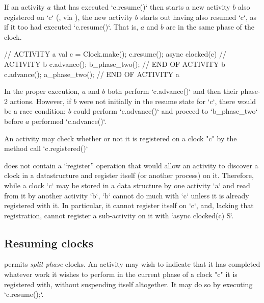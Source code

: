 
If an activity {$a$} that has executed \xcd`c.resume()` then starts a
new activity {$b$} also registered on \xcd`c` (\eg, via ), the new activity {$b$} starts out having also resumed
\xcd`c`, as if it too had executed \xcd`c.resume()`. That is, $a$ and {$b$}
are in the same phase of the clock. 
\begin{xten}
// ACTIVITY a
val c = Clock.make();
c.resume();
async clocked(c) {
  // ACTIVITY b
  c.advance();
  b_phase_two();
  // END OF ACTIVITY b
}
c.advance();
a_phase_two();
// END OF ACTIVITY a
\end{xten}
In the proper execution, {$a$} and {$b$} both perform
\xcd`c.advance()` and then their phase-2 actions.  
However, if {$b$} were not
initially in the resume state for \xcd`c`, there would be a race condition;
{$b$} could perform \xcd`c.advance()` and proceed to \xcd`b_phase_two`
before {$a$} performed \xcd`c.advance()`.


An activity may check whether or not it is registered on a clock \xcd"c" by
the method call \xcd`c.registered()`


\begin{note}
\Xten{} does not contain a ``register'' operation that would allow an activity
to discover a clock in a datastructure and register itself (or another
process) on it. Therefore,
while a clock \xcd`c` may be stored in a data structure by one activity
\xcd`a` and read from it by another activity \xcd`b`, \xcd`b` cannot do much
with \xcd`c` unless it is already registered with it.  In particular, it
cannot register itself on \xcd`c`, and, lacking that registration, cannot
register a sub-activity on it with \xcd`async clocked(c) S`.
\end{note}


\subsection{Resuming clocks}\label{resume}\label{sec:clock:resume}
\Xten{} permits {\em split phase} clocks. An activity may wish
to indicate that it has completed whatever work it wishes to perform
in the current phase of a  clock \xcd"c" it is registered with, without
suspending itself altogether. It may do so  by executing 
\xcd`c.resume();`.



